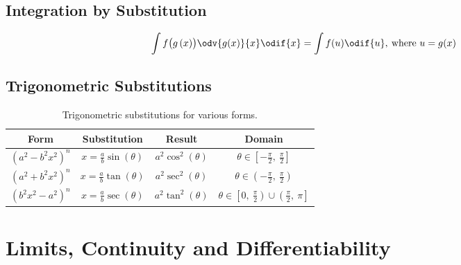 \documentclass{article}
\begin{document}
\subsection{Integration by Substitution}
\begin{theorem}
    \begin{equation*}
        \int f\bigl(g\left( x \right)\bigr)\odv{g(x)}{x} \odif{x} = \int f(u) \odif{u}, \: \text{where } u = g(x)
    \end{equation*}
\end{theorem}
\subsection{Trigonometric Substitutions}
\begin{table}[H]
    \renewcommand*{\arraystretch}{1.5}
    \centering
    \begin{tabular}{c c c c}
        \toprule
        \textbf{Form}      & \textbf{Substitution}                           & \textbf{Result}           & \textbf{Domain}                                                             \\
        \midrule
        \(\left(a^2-b^2x^2\right)^n\) & \(\displaystyle x=\frac{a}{b}\sin{\left( \theta \right)}\) & \(a^2\cos^2{\left( \theta \right)}\) & \(\theta\in \left[ -\frac{\pi}{2},\: \frac{\pi}{2} \right]\)                           \\[8pt]
        \(\left(a^2+b^2x^2\right)^n\) & \(\displaystyle x=\frac{a}{b}\tan{\left( \theta \right)}\) & \(a^2\sec^2{\left( \theta \right)}\) & \(\theta\in \left( -\frac{\pi}{2},\: \frac{\pi}{2} \right)\)                           \\[8pt]
        \(\left(b^2x^2-a^2\right)^n\) & \(\displaystyle x=\frac{a}{b}\sec{\left( \theta \right)}\) & \(a^2\tan^2{\left( \theta \right)}\) & \(\theta\in \left[ 0,\: \frac{\pi}{2} \right) \cup \left(\frac{\pi}{2},\: \pi\right]\) \\ %
        \bottomrule
    \end{tabular}
    \caption{Trigonometric substitutions for various forms.}
\end{table}
\newpage
\section{Limits, Continuity and Differentiability}
\end{document}
